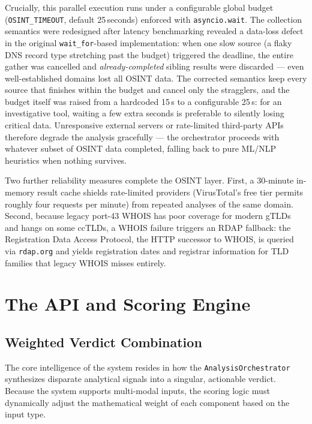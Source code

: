 Crucially, this parallel execution runs under a configurable global
budget (\texttt{OSINT\_TIMEOUT}, default 25\,seconds) enforced with
\texttt{asyncio.wait}. The collection semantics were redesigned after
latency benchmarking revealed a data-loss defect in the original
\texttt{wait\_for}-based implementation: when one slow source (a flaky
DNS record type stretching past the budget) triggered the deadline, the
entire gather was cancelled and \emph{already-completed} sibling results
were discarded --- even well-established domains lost all OSINT data.
The corrected semantics keep every source that finishes within the
budget and cancel only the stragglers, and the budget itself was raised
from a hardcoded 15\,s to a configurable 25\,s: for an investigative
tool, waiting a few extra seconds is preferable to silently losing
critical data. Unresponsive external servers or rate-limited
third-party APIs therefore degrade the analysis gracefully --- the
orchestrator proceeds with whatever subset of OSINT data completed,
falling back to pure ML/NLP heuristics when nothing survives.

Two further reliability measures complete the OSINT layer. First, a
30-minute in-memory result cache shields rate-limited providers
(VirusTotal's free tier permits roughly four requests per minute) from
repeated analyses of the same domain. Second, because legacy port-43
WHOIS has poor coverage for modern gTLDs and hangs on some ccTLDs, a
WHOIS failure triggers an RDAP fallback: the Registration Data Access
Protocol, the HTTP successor to WHOIS, is queried via \texttt{rdap.org}
and yields registration dates and registrar information for TLD
families that legacy WHOIS misses entirely.

\section{The API and Scoring
Engine}\label{the-api-and-scoring-engine}

\subsection{Weighted Verdict
Combination}\label{weighted-verdict-combination}

The core intelligence of the system resides in how the
\texttt{AnalysisOrchestrator} synthesizes disparate analytical signals
into a singular, actionable verdict. Because the system supports
multi-modal inputs, the scoring logic must dynamically adjust the
mathematical weight of each component based on the input type.

